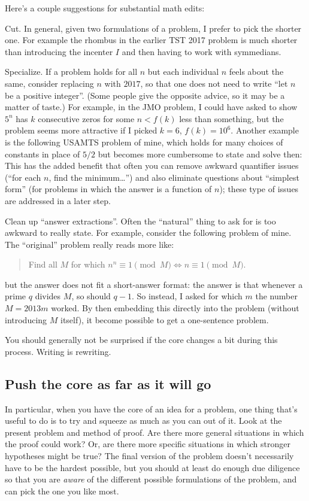 \documentclass[11pt]{scrartcl}
\renewcommand{\vonenvname}{inlineprob}
\theoremstyle{inlined}
\begin{document}
\renewcommand{\vonenvname}{inlineprob}
Here's a couple suggestions for substantial math edits:
\begin{itemize}
  \ii \alert{Cut}.
  In general, given two formulations of a problem, I prefer to pick the shorter one.
  For example the rhombus in the earlier TST 2017 problem
  is much shorter than introducing the incenter $I$
  and then having to work with symmedians.

  \ii \alert{Specialize}.
  If a problem holds for all $n$ but each individual $n$
  feels about the same, consider replacing $n$ with $2017$,
  so that one does not need to write ``let $n$ be a positive integer''.
  (Some people give the opposite advice, so it may be a matter of taste.)
  For example, in the JMO problem, I could have asked to
  show $5^n$ has $k$ consecutive zeros for some $n < f(k)$ less than something,
  but the problem seems more attractive if I picked $k = 6$, $f(k) = 10^6$.
  Another example is the following USAMTS problem of mine,
  which holds for many choices of constants in place of $5/2$
  but becomes more cumbersome to state and solve then:
  This has the added benefit that often you can remove
  awkward quantifier issues (``for each $n$, find the minimum\dots'')
  and also eliminate questions about ``simplest form''
  (for problems in which the answer is a function of $n$);
  these type of issues are addressed in a later step.

  \ii \alert{Clean up ``answer extractions''}.
  Often the ``natural'' thing to ask for is too awkward to really state.
  For example, consider the following problem of mine.
  The ``original'' problem really reads more like:
  \begin{quote}
     Find all $M$ for which $n^n \equiv 1 \pmod M \iff n \equiv 1 \pmod M$.
  \end{quote}
  but the answer does not fit a short-answer format:
  the answer is that whenever a prime $q$ divides $M$, so should $q-1$.
  So instead, I asked for which $m$ the number $M = 2013m$ worked.
  By then embedding this directly into the problem (without introducing $M$ itself),
  it become possible to get a one-sentence problem.
\end{itemize}

You should generally not be surprised if the core changes
a bit during this process. Writing is rewriting.

\subsection{Push the core as far as it will go}
In particular, when you have the core of an idea for a problem,
one thing that's useful to do is to try and squeeze as much as you can out of it.
Look at the present problem and method of proof.
Are there more general situations in which the proof could work?
Or, are there more specific situations in which stronger hypotheses might be true?
The final version of the problem doesn't necessarily have to be the hardest possible,
but you should at least do enough due diligence
so that you are \emph{aware} of the different possible formulations of the problem,
and can pick the one you like most.
\end{document}
